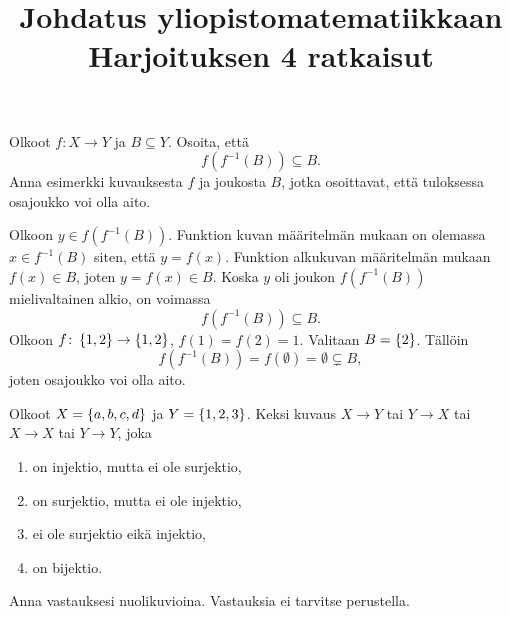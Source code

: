\documentclass[11pt,a4paper]{amsart}
\title{Johdatus yliopistomatematiikkaan\\Harjoituksen 4 ratkaisut}
\date{}
\author{}
\begin{document}

\begin{exercise}
  Olkoot \(f \colon X \to Y\) ja \(B \subseteq Y\). Osoita, että
  \[
    f(f^{-1}(B)) \subseteq B.
  \]
  Anna esimerkki kuvauksesta \(f\) ja joukosta \(B\), jotka osoittavat,
  että tuloksessa osajoukko voi olla aito.
\end{exercise}

\begin{solution}
  Olkoon \(y \in f(f^{-1}(B))\). Funktion kuvan määritelmän mukaan on olemassa
  \(x \in f^{-1}(B)\) siten, että \(y = f(x)\). Funktion alkukuvan
  määritelmän mukaan \(f(x) \in B\), joten \(y = f(x) \in B\).
  Koska \(y\) oli joukon \(f(f^{-1}(B))\)
  mielivaltainen alkio, on voimassa
  \[
    f(f^{-1}(B)) \subseteq B.
  \]
  Olkoon \(f \colon \left\lbrace1, 2\right\rbrace \to \left\lbrace1, 2\right\rbrace\), \(f(1) = f(2) = 1\).
  Valitaan \(B = \left\lbrace2\right\rbrace\). Tällöin
  \[
    f(f^{-1}(B)) = f(\emptyset) = \emptyset \subsetneq B,
  \]
  joten osajoukko voi olla aito.
\end{solution}

\begin{exercise}
  Olkoot \(X = \left\lbrace a, b, c, d\right\rbrace\) ja \(Y = \left\lbrace1, 2, 3\right\rbrace\). Keksi kuvaus
  \(X \to Y\) tai \(Y \to X\) tai \(X \to X\) tai \(Y \to Y\), joka
\begin{enumerate}[label=\alph*), nosep]
  \item on injektio, mutta ei ole surjektio,
  \item on surjektio, mutta ei ole injektio,
  \item ei ole surjektio eikä injektio,
  \item on bijektio.
\end{enumerate}
Anna vastauksesi nuolikuvioina. Vastauksia ei tarvitse perustella.
\end{exercise}
\end{document}
